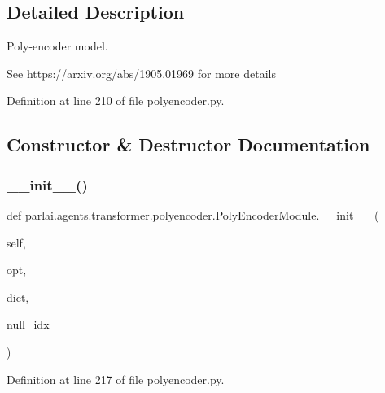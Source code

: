 \subsection{Detailed Description}
\begin{DoxyVerb}Poly-encoder model.

See https://arxiv.org/abs/1905.01969 for more details
\end{DoxyVerb}
 

Definition at line 210 of file polyencoder.\+py.



\subsection{Constructor \& Destructor Documentation}
\mbox{\label{classparlai_1_1agents_1_1transformer_1_1polyencoder_1_1PolyEncoderModule_acf6f1b0dd5025b20c330d08bd2a13755}} 
\subsubsection{\texorpdfstring{\+\_\+\+\_\+init\+\_\+\+\_\+()}{\_\_init\_\_()}}
{\footnotesize\ttfamily def parlai.\+agents.\+transformer.\+polyencoder.\+Poly\+Encoder\+Module.\+\_\+\+\_\+init\+\_\+\+\_\+ (\begin{DoxyParamCaption}\item[{}]{self,  }\item[{}]{opt,  }\item[{}]{dict,  }\item[{}]{null\+\_\+idx }\end{DoxyParamCaption})}



Definition at line 217 of file polyencoder.\+py.


